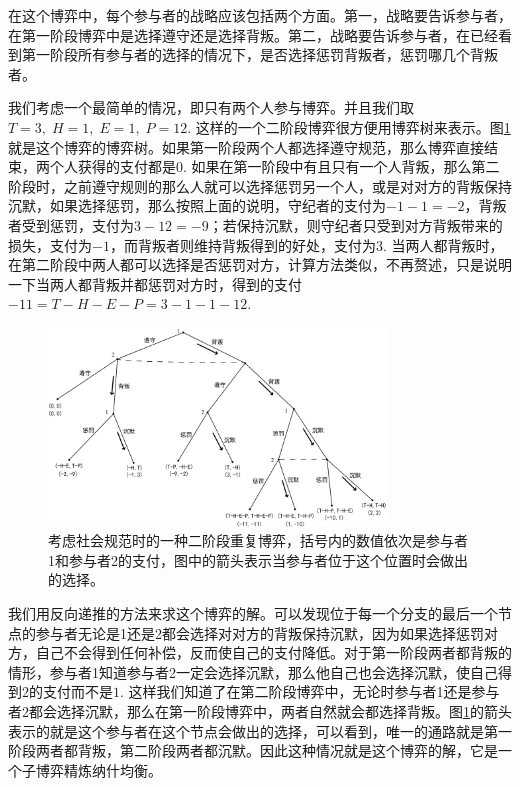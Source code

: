 \documentclass[lang=cn,11pt]{elegantpaper}
\begin{document}
在这个博弈中，每个参与者的战略应该包括两个方面。第一，战略要告诉参与者，在第一阶段博弈中是选择遵守还是选择背叛。第二，战略要告诉参与者，在已经看到第一阶段所有参与者的选择的情况下，是否选择惩罚背叛者，惩罚哪几个背叛者。

我们考虑一个最简单的情况，即只有两个人参与博弈。并且我们取$T=3,\;H=1,\;E=1,\;P=12$. 这样的一个二阶段博弈很方便用博弈树来表示。图\ref{fig:社会规范博弈树}就是这个博弈的博弈树。如果第一阶段两个人都选择遵守规范，那么博弈直接结束，两个人获得的支付都是$0$. 如果在第一阶段中有且只有一个人背叛，那么第二阶段时，之前遵守规则的那么人就可以选择惩罚另一个人，或是对对方的背叛保持沉默，如果选择惩罚，那么按照上面的说明，守纪者的支付为$-1-1=-2$，背叛者受到惩罚，支付为$3-12=-9$；若保持沉默，则守纪者只受到对方背叛带来的损失，支付为$-1$，而背叛者则维持背叛得到的好处，支付为$3$. 当两人都背叛时，在第二阶段中两人都可以选择是否惩罚对方，计算方法类似，不再赘述，只是说明一下当两人都背叛并都惩罚对方时，得到的支付$-11=T-H-E-P=3-1-1-12$.
\begin{figure}[htb]
	\centering
	\includegraphics[width=0.8\textwidth]{figure/社会规范博弈树.png}
	\caption{考虑社会规范时的一种二阶段重复博弈，括号内的数值依次是参与者1和参与者2的支付，图中的箭头表示当参与者位于这个位置时会做出的选择。 \label{fig:社会规范博弈树}}
\end{figure}

我们用反向递推的方法来求这个博弈的解。可以发现位于每一个分支的最后一个节点的参与者无论是1还是2都会选择对对方的背叛保持沉默，因为如果选择惩罚对方，自己不会得到任何补偿，反而使自己的支付降低。对于第一阶段两者都背叛的情形，参与者1知道参与者2一定会选择沉默，那么他自己也会选择沉默，使自己得到$2$的支付而不是$1$. 这样我们知道了在第二阶段博弈中，无论时参与者1还是参与者2都会选择沉默，那么在第一阶段博弈中，两者自然就会都选择背叛。图\ref{fig:社会规范博弈树}的箭头表示的就是这个参与者在这个节点会做出的选择，可以看到，唯一的通路就是第一阶段两者都背叛，第二阶段两者都沉默。因此这种情况就是这个博弈的解，它是一个子博弈精炼纳什均衡。
\end{document}
